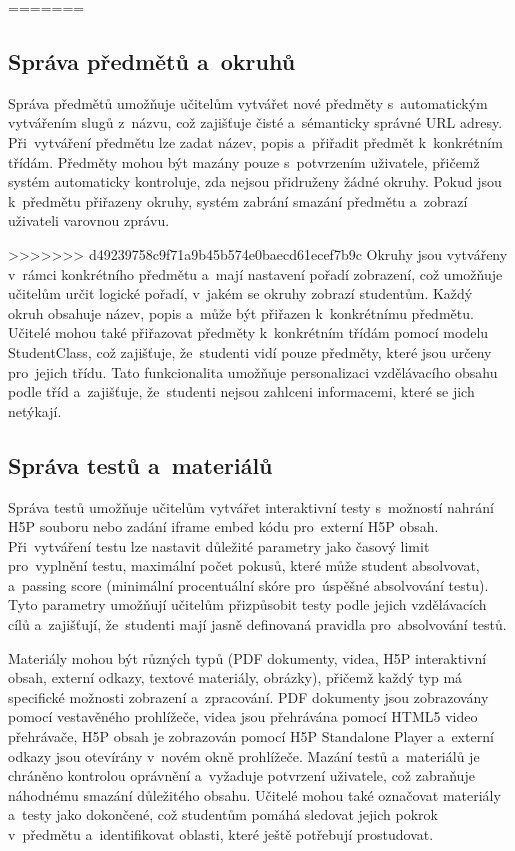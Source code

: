\documentclass[12pt, a4paper,
twoside,
openany
]{report}
\begin{document}
=======
	\subsection{Správa předmětů a~okruhů}
	
	Správa předmětů umožňuje učitelům vytvářet nové předměty s~automatickým vytvářením slugů z~názvu, což zajišťuje čisté a~sémanticky správné URL adresy. Při~vytváření předmětu lze zadat název, popis a~přiřadit předmět k~konkrétním třídám. Předměty mohou být mazány pouze s~potvrzením uživatele, přičemž systém automaticky kontroluje, zda nejsou přidruženy žádné okruhy. Pokud jsou k~předmětu přiřazeny okruhy, systém zabrání smazání předmětu a~zobrazí uživateli varovnou zprávu.
	
>>>>>>> d49239758c9f71a9b45b574e0baecd61ecef7b9c
	Okruhy jsou vytvářeny v~rámci konkrétního předmětu a~mají nastavení pořadí zobrazení, což umožňuje učitelům určit logické pořadí, v~jakém se okruhy zobrazí studentům. Každý okruh obsahuje název, popis a~může být přiřazen k~konkrétnímu předmětu. Učitelé mohou také přiřazovat předměty k~konkrétním třídám pomocí modelu StudentClass, což zajišťuje, že~studenti vidí pouze předměty, které jsou určeny pro~jejich třídu. Tato funkcionalita umožňuje personalizaci vzdělávacího obsahu podle tříd a~zajišťuje, že~studenti nejsou zahlceni informacemi, které se jich netýkají.

	\subsection{Správa testů a~materiálů}
	
	Správa testů umožňuje učitelům vytvářet interaktivní testy s~možností nahrání H5P souboru nebo zadání iframe embed kódu pro~externí H5P obsah. Při~vytváření testu lze nastavit důležité parametry jako časový limit pro~vyplnění testu, maximální počet pokusů, které může student absolvovat, a~passing score (minimální procentuální skóre pro~úspěšné absolvování testu). Tyto parametry umožňují učitelům přizpůsobit testy podle jejich vzdělávacích cílů a~zajišťují, že~studenti mají jasně definovaná pravidla pro~absolvování testů.
	
	Materiály mohou být různých typů (PDF dokumenty, videa, H5P interaktivní obsah, externí odkazy, textové materiály, obrázky), přičemž každý typ má specifické možnosti zobrazení a~zpracování. PDF dokumenty jsou zobrazovány pomocí vestavěného prohlížeče, videa jsou přehrávána pomocí HTML5 video přehrávače, H5P obsah je zobrazován pomocí H5P Standalone Player a~externí odkazy jsou otevírány v~novém okně prohlížeče. Mazání testů a~materiálů je chráněno kontrolou oprávnění a~vyžaduje potvrzení uživatele, což zabraňuje náhodnému smazání důležitého obsahu. Učitelé mohou také označovat materiály a~testy jako dokončené, což studentům pomáhá sledovat jejich pokrok v~předmětu a~identifikovat oblasti, které ještě potřebují prostudovat.
\end{document}
